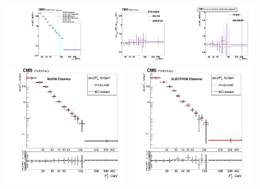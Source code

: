 \begin{figure}[htb]
  \begin{center}
   \includegraphics[width=0.33\textwidth]{../figs/figs_v11/ChannelsMERGED_ZGamma/CrossSection/compareCSZGamma.pdf}\includegraphics[width=0.33\textwidth]{../figs/figs_v11/ChannelsMERGED_ZGamma/CrossSection/compareCSratioTheoryZGamma.pdf}\includegraphics[width=0.33\textwidth]{../figs/figs_v11/ChannelsMERGED_ZGamma/CrossSection/compareCSratioOttoZGamma.pdf}
      \includegraphics[width=0.48\textwidth]{../figs/figs_v11/MUON_ZGamma/CrossSection/c_CS_MUON_ZGamma_UNblind.png} \includegraphics[width=0.48\textwidth]{../figs/figs_v11/ELECTRON_ZGamma/CrossSection/c_CS_ELECTRON_ZGamma_UNblind.png}

\end{center}
\end{figure}
